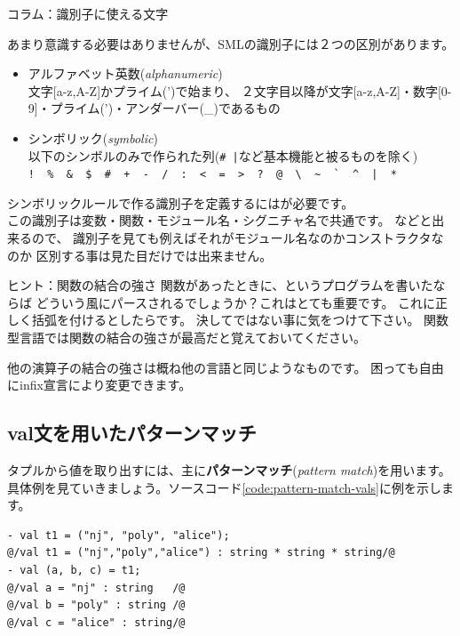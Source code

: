 \documentclass[11pt,a4paper]{jarticle}
\begin{document}
\begin{itembox}[l]{コラム：識別子に使える文字}

あまり意識する必要はありませんが、SMLの識別子には２つの区別があります。

\begin{itemize}
\item アルファベット英数(\textit{alphanumeric}) \\
  文字[a-z,A-Z]かプライム(')で始まり、
  ２文字目以降が文字[a-z,A-Z]・数字[0-9]・プライム(')・アンダーバー(\_)であるもの
\item シンボリック(\textit{symbolic})\\
  以下のシンボルのみで作られた列(\verb(# |(など基本機能と被るものを除く)\\
\Verb(!  %  &  $  #  +  -  /  :  <  =  >  ?  @  \  ~  `  ^  |  *(
\end{itemize}
シンボリックルールで作る識別子を定義するにはが必要です。\\
この識別子は変数・関数・モジュール名・シグニチャ名で共通です。
などと出来るので、
識別子を見ても例えばそれがモジュール名なのかコンストラクタなのか
区別する事は見た目だけでは出来ません。
\end{itembox}

\begin{itembox}[l]{ヒント：関数の結合の強さ}
関数があったときに、というプログラムを書いたならば
どういう風にパースされるでしょうか？これはとても重要です。
これに正しく括弧を付けるとしたらです。
決してではない事に気をつけて下さい。
関数型言語では関数の結合の強さが最高だと覚えておいてください。

他の演算子の結合の強さは概ね他の言語と同じようなものです。
困っても自由にinfix宣言により変更できます。
\end{itembox}

\subsection{val文を用いたパターンマッチ}

タプルから値を取り出すには、主に{\bfseries パターンマッチ}({\itshape pattern match})を用います。
具体例を見ていきましょう。ソースコード\ref{code:pattern-match-vals}に例を示します。

\begin{lstlisting}[caption=val文でパターンマッチ,label=code:pattern-match-vals]
- val t1 = ("nj", "poly", "alice");
@/val t1 = ("nj","poly","alice") : string * string * string/@
- val (a, b, c) = t1;
@/val a = "nj" : string   /@
@/val b = "poly" : string /@
@/val c = "alice" : string/@
\end{lstlisting}
\end{document}
